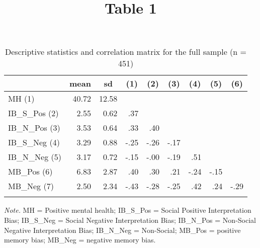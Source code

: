 \documentclass[]{article}
\title{Table 1}
\author{}
\date{}
\begin{document}
\maketitle

\begin{table}[tbp]
\begin{center}
\begin{threeparttable}
\caption{Descriptive statistics and correlation matrix for the full sample (n = 451)}
\begin{tabular}{lrrrrrrrr}
\toprule
 & \multicolumn{1}{c}{mean} & \multicolumn{1}{c}{sd} & \multicolumn{1}{c}{(1)} & \multicolumn{1}{c}{(2)} & \multicolumn{1}{c}{(3)} & \multicolumn{1}{c}{(4)} & \multicolumn{1}{c}{(5)} & \multicolumn{1}{c}{(6)}\\
\midrule
MH (1) & 40.72 & 12.58 &  &  &  &  &  & \\
IB\_S\_Pos (2) & 2.55 & 0.62 & .37 &  &  &  &  & \\
IB\_N\_Pos (3) & 3.53 & 0.64 & .33 & .40 &  &  &  & \\
IB\_S\_Neg (4) & 3.29 & 0.88 & -.25 & -.26 & -.17 &  &  & \\
IB\_N\_Neg (5) & 3.17 & 0.72 & -.15 & -.00 & -.19 & .51 &  & \\
MB\_Pos (6) & 6.83 & 2.87 & .40 & .30 & .21 & -.24 & -.15 & \\
MB\_Neg (7) & 2.50 & 2.34 & -.43 & -.28 & -.25 & .42 & .24 & -.29\\
\bottomrule
\addlinespace
\end{tabular}
\begin{tablenotes}[para]
\normalsize{\textit{Note.} MH = Positive mental health; IB\_S\_Pos = Social Positive Interpretation Bias; IB\_S\_Neg = Social Negative Interpretation Bias; IB\_N\_Pos = Non-Social Negative Interpretation Bias; IB\_N\_Neg = Non-Social; MB\_Pos = positive memory bias; MB\_Neg = negative memory bias.}
\end{tablenotes}
\end{threeparttable}
\end{center}
\end{table}
\end{document}
